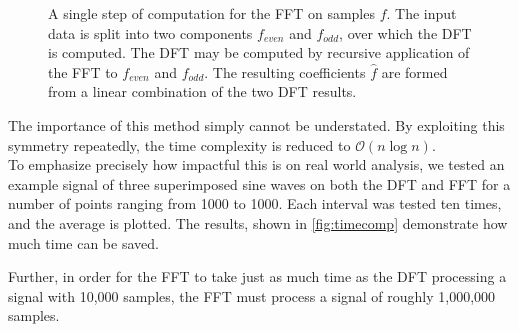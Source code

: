 \documentclass[10pt]{article}
\begin{document}
\begin{figure}
    \caption{A single step of computation for the FFT on samples \(f\). The input data is split into two components \(f_{even}\) and \(f_{odd}\), over which the DFT is computed. The DFT may be computed by recursive application of the FFT to \(f_{even}\) and \(f_{odd}\). The resulting coefficients \(\hat{f}\) are formed from a linear combination of the two DFT results.}
    \label{fig:fft_schematic}
\end{figure}





The importance of this method simply cannot be understated. By exploiting this symmetry repeatedly, the time complexity is reduced
to $\mathcal{O}(n\log n)$.\\

To emphasize precisely how impactful this is on real world analysis, we tested an example signal of three superimposed sine waves on both the DFT and FFT for a number of points ranging from 1000 to 1000. Each interval was tested ten times, and the average is plotted. The results, shown in \ref{fig:timecomp} demonstrate how much time can be saved. 

 Further, in order for the FFT to take just as much time as the DFT processing a signal with 10,000 samples, the FFT must process a signal of roughly 1,000,000 samples. \\
\end{document}
